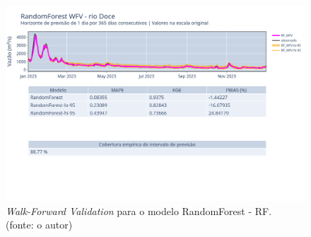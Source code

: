 \begin{figure}[!h]
	\centering
	\includegraphics[scale=0.33]{Figuras/rio_doce/wfv/RF/RF_WFV_ORIG.png}
	\caption{\textit{Walk-Forward Validation} para o modelo RandomForest - RF.\\(fonte: o autor)}
	\label{fig:doce_RF_WFV_ORIG}
\end{figure}
\clearpage

%


